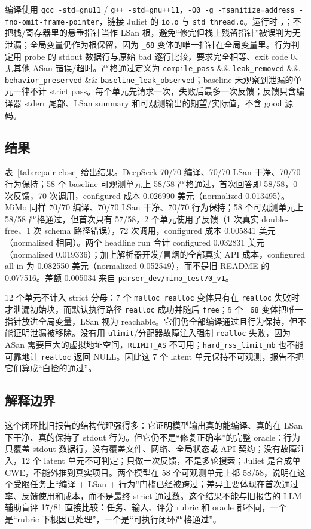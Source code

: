 \documentclass[conference]{IEEEtran}
\begin{document}
编译使用 \texttt{gcc -std=gnu11} / \texttt{g++ -std=gnu++11}，\texttt{-O0 -g -fsanitize=address -fno-omit-frame-pointer}，链接 Juliet 的 \texttt{io.o} 与 \texttt{std\_thread.o}。运行时 ，；不把栈/寄存器里的悬垂指针当作 LSan 根，避免“修完但栈上残留指针”被误判为无泄漏；全局变量仍作为根保留，因为 \texttt{\_68} 变体的唯一指针在全局变量里。行为判定用 probe 的 stdout 数据行与原始 bad 逐行比较，要求完全相等、exit code 0、无其他 ASan 错误/超时。严格通过定义为 \texttt{compile\_pass} \&\& \texttt{leak\_removed} \&\& \texttt{behavior\_preserved} \&\& \texttt{baseline\_leak\_observed}；baseline 未观察到泄漏的单元一律不计 strict pass。每个单元先请求一次，失败后最多一次反馈；反馈只含编译器 stderr 尾部、LSan summary 和可观测输出的期望/实际值，不含 good 源码。



\subsection{结果}
表~\ref{tab:repair-close} 给出结果。DeepSeek 70/70 编译、70/70 LSan 干净、70/70 行为保持；58 个 baseline 可观测单元上 58/58 严格通过，首次回答即 58/58，0 次反馈，70 次调用，configured 成本 0.026990 美元（normalized 0.013495）。MiMo 同样 70/70 编译、70/70 LSan 干净、70/70 行为保持；58 个可观测单元上 58/58 严格通过，但首次只有 57/58，2 个单元使用了反馈（1 次真实 double-free、1 次 schema 路径错误），72 次调用，configured 成本 0.005841 美元（normalized 相同）。两个 headline run 合计 configured 0.032831 美元（normalized 0.019336）；加上解析器开发/冒烟的全部真实 API 成本，configured all-in 为 0.082550 美元（normalized 0.052549），而不是旧 README 的 0.077516。差额 0.005034 来自 \texttt{parser\_dev/mimo\_test70\_v1}。

12 个单元不计入 strict 分母：7 个 \texttt{malloc\_realloc} 变体只有在 \texttt{realloc} 失败时才泄漏初始块，而默认执行路径 \texttt{realloc} 成功并随后 \texttt{free}；5 个 \texttt{\_68} 变体把唯一指针放进全局变量，LSan 视为 reachable。它们仍全部编译通过且行为保持，但不能证明泄漏被移除。没有用 \texttt{ulimit}/分配器故障注入强制 \texttt{realloc} 失败，因为 ASan 需要巨大的虚拟地址空间，\texttt{RLIMIT\_AS} 不可用；\texttt{hard\_rss\_limit\_mb} 也不能可靠地让 \texttt{realloc} 返回 NULL。因此这 7 个 latent 单元保持不可观测，报告不把它们算成“白捡的通过”。

\subsection{解释边界}
这个闭环比旧报告的结构代理强得多：它证明模型输出真的能编译、真的在 LSan 下干净、真的保持了 stdout 行为。但它仍不是“修复正确率”的完整 oracle：行为只覆盖 stdout 数据行，没有覆盖文件、网络、全局状态或 API 契约；没有故障注入，12 个 latent 单元不可判定；只做一次反馈，不是多轮搜索；Juliet 是合成单 CWE，不能外推到真实项目。两个模型在 58 个可观测单元上都 58/58，说明在这个受限任务上“编译 + LSan + 行为”门槛已经被跨过；差异主要体现在首次通过率、反馈使用和成本，而不是最终 strict 通过数。这个结果不能与旧报告的 LLM 辅助盲评 17/81 直接比较：任务、输入、评分 rubric 和 oracle 都不同，一个是“rubric 下根因已处理”，一个是“可执行闭环严格通过”。
\end{document}
